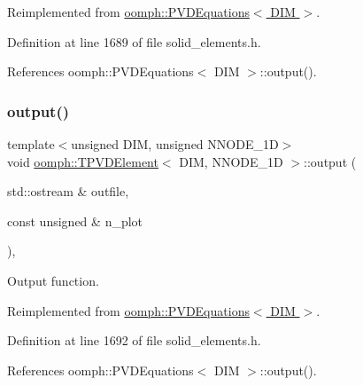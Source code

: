 Reimplemented from \hyperlink{classoomph_1_1PVDEquations_ab9e919921934cfe7433420bd2e4482f5}{oomph\+::\+P\+V\+D\+Equations$<$ D\+I\+M $>$}.



Definition at line 1689 of file solid\+\_\+elements.\+h.



References oomph\+::\+P\+V\+D\+Equations$<$ D\+I\+M $>$\+::output().

\mbox{\label{classoomph_1_1TPVDElement_a16716e0b772f7a13b885faeb4def1cfa}} 
\subsubsection{\texorpdfstring{output()}{output()}\hspace{0.1cm}{\footnotesize\ttfamily [2/4]}}
{\footnotesize\ttfamily template$<$unsigned D\+IM, unsigned N\+N\+O\+D\+E\+\_\+1D$>$ \\
void \hyperlink{classoomph_1_1TPVDElement}{oomph\+::\+T\+P\+V\+D\+Element}$<$ D\+IM, N\+N\+O\+D\+E\+\_\+1D $>$\+::output (\begin{DoxyParamCaption}\item[{std\+::ostream \&}]{outfile,  }\item[{const unsigned \&}]{n\+\_\+plot }\end{DoxyParamCaption})\hspace{0.3cm}{\ttfamily [inline]}, {\ttfamily [virtual]}}



Output function. 



Reimplemented from \hyperlink{classoomph_1_1PVDEquations_a5e3a09d059ced1ee9f9e1a7923171ab7}{oomph\+::\+P\+V\+D\+Equations$<$ D\+I\+M $>$}.



Definition at line 1692 of file solid\+\_\+elements.\+h.



References oomph\+::\+P\+V\+D\+Equations$<$ D\+I\+M $>$\+::output().

\mbox{\label{classoomph_1_1TPVDElement_a272dff6c1e74e2634e2df71b33319e19}} 
